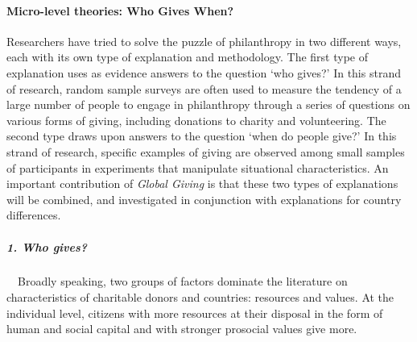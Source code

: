\documentclass[twocolumn, serif, rga, numeric]{jote-article}
\begin{document}
\paragraph{Micro-level theories: Who Gives When?}

Researchers have tried to solve the puzzle of philanthropy in two different ways, each with its own type of explanation and methodology.
The first type of explanation uses as evidence answers to the question `who gives?' In this strand of research, random sample surveys are often used to measure the tendency of a large number of people to engage in philanthropy through a series of questions on various forms of giving, including donations to charity and volunteering. The second type draws upon answers to the question `when do people give?' In this strand of research, specific examples of giving are observed among small samples of participants in experiments that manipulate situational characteristics. An important contribution of \emph{Global Giving} is that these two types of explanations will be combined, and investigated in conjunction with explanations for country differences.

\subparagraph{1. Who gives?}

\ \ Broadly speaking, two groups of factors dominate the literature on characteristics of charitable donors and countries: resources and values. At the individual level, citizens with more resources at their disposal in the form of human and social capital and with stronger prosocial values give more.
\end{document}

